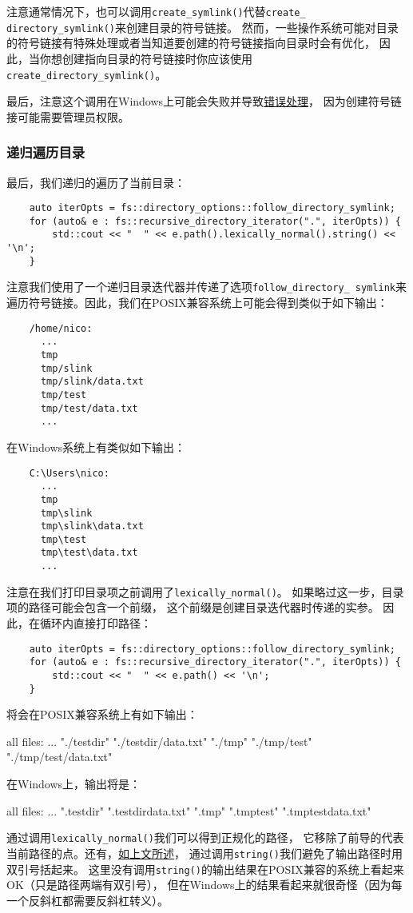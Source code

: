 注意通常情况下，也可以调用\texttt{create\_symlink()}代替\texttt{create\_
directory\_symlink()}来创建目录的符号链接。
然而，一些操作系统可能对目录的符号链接有特殊处理或者当知道要创建的符号链接指向目录时会有优化，
因此，当你想创建指向目录的符号链接时你应该使用\texttt{create\_directory\_symlink()}。

最后，注意这个调用在Windows上可能会失败并导致\hyperref[创建链接失败]{错误处理}，
因为创建符号链接可能需要管理员权限。

\subsubsection{递归遍历目录}\label{ch20.1.3.5}
最后，我们递归的遍历了当前目录：
\begin{lstlisting}
    auto iterOpts = fs::directory_options::follow_directory_symlink;
    for (auto& e : fs::recursive_directory_iterator(".", iterOpts)) {
        std::cout << "  " << e.path().lexically_normal().string() << '\n';
    }
\end{lstlisting}
注意我们使用了一个递归目录迭代器并传递了选项\texttt{follow\_directory\_
symlink}来遍历符号链接。因此，我们在POSIX兼容系统上可能会得到类似于如下输出：
\begin{lstlisting}
    /home/nico:
      ...
      tmp
      tmp/slink
      tmp/slink/data.txt
      tmp/test
      tmp/test/data.txt
      ...
\end{lstlisting}
在Windows系统上有类似如下输出：
\begin{lstlisting}
    C:\Users\nico:
      ...
      tmp
      tmp\slink
      tmp\slink\data.txt
      tmp\test
      tmp\test\data.txt
      ...
\end{lstlisting}
注意在我们打印目录项之前调用了\texttt{lexically\_normal()}。
如果略过这一步，目录项的路径可能会包含一个前缀，
这个前缀是创建目录迭代器时传递的实参。
因此，在循环内直接打印路径：
\begin{lstlisting}
    auto iterOpts = fs::directory_options::follow_directory_symlink;
    for (auto& e : fs::recursive_directory_iterator(".", iterOpts)) {
        std::cout << "  " << e.path() << '\n';
    }
\end{lstlisting}
将会在POSIX兼容系统上有如下输出：
\begin{blacklisting}
    all files:
      ...
      "./testdir"
      "./testdir/data.txt"
      "./tmp"
      "./tmp/test"
      "./tmp/test/data.txt"
\end{blacklisting}
在Windows上，输出将是：
\begin{blacklisting}
    all files:
      ...
      ".testdir"
      ".testdirdata.txt"
      ".tmp"
      ".tmptest"
      ".tmptestdata.txt"
\end{blacklisting}
通过调用\texttt{lexically\_normal()}我们可以得到正规化的路径，
它移除了前导的代表当前路径的点。还有，\hyperref[ch20.1.1.1]{如上文所述}，
通过调用\texttt{string()}我们避免了输出路径时用双引号括起来。
这里没有调用\texttt{string()}的输出结果在POSIX兼容的系统上看起来OK（只是路径两端有双引号），
但在Windows上的结果看起来就很奇怪（因为每一个反斜杠都需要反斜杠转义）。

